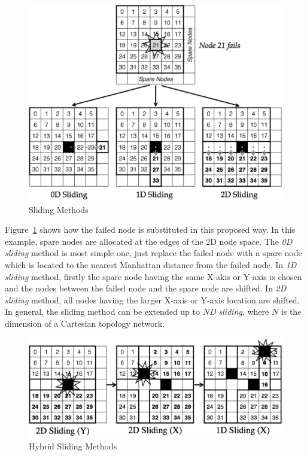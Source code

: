 \begin{figure}[ht]
\begin{center}
\includegraphics[width=0.95\columnwidth]{Figs/SlidingSubstitution.pdf}
  \caption{Sliding Methods}
  \label{fig:sliding-methods}
\end{center}
\end{figure}

Figure~\ref{fig:sliding-methods} shows how the failed node is
substituted in this proposed way. In this example, spare nodes are
allocated at the edges of the 2D node space. The {\em 0D sliding}
method is most simple one, just replace the failed node with a spare
node which is located to the nearest Manhattan distance from the
failed node. In {\em 1D sliding} method, firstly the spare node having
the same X-akis or Y-axis is chosen and the nodes between the failed
node and the spare node are shifted. In {\em 2D sliding} method, all
nodes having the larger X-axis or Y-axis location are shifted. In
general, the sliding method can be extended up to {\em $N$D sliding},
where $N$ is the dimension of a Cartesian topology network.

\begin{figure}[ht]
\begin{center}
\includegraphics[width=0.95\columnwidth]{Figs/HybridSliding.pdf}
  \caption{Hybrid Sliding Methods}
  \label{fig:hybrid-methods}
\end{center}
\end{figure}

